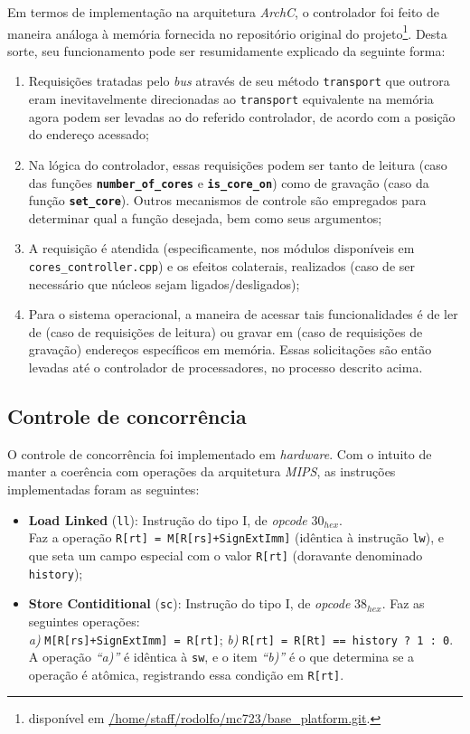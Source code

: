 \documentclass[11pt, a4paper]{article}
\begin{document}
Em termos de implementação na arquitetura \textit{ArchC}, o controlador foi feito de maneira análoga à memória fornecida no repositório original do projeto\footnote{disponível em \url{/home/staff/rodolfo/mc723/base_platform.git}.}. Desta sorte, seu funcionamento pode ser resumidamente explicado da seguinte forma:
\begin{enumerate}
\item Requisições tratadas pelo \textit{bus} através de seu método \texttt{transport} que outrora eram inevitavelmente direcionadas ao \texttt{transport} equivalente na memória agora podem ser levadas ao do referido controlador, de acordo com a posição do endereço acessado;
\item Na lógica do controlador, essas requisições podem ser tanto de leitura (caso das funções \textbf{\texttt{number\_of\_cores}} e \textbf{\texttt{is\_core\_on}}) como de gravação (caso da função \textbf{\texttt{set\_core}}). Outros mecanismos de controle são empregados para determinar qual a função desejada, bem como seus argumentos;
\item A requisição é atendida (especificamente, nos módulos disponíveis em \texttt{cores\_controller.cpp}) e os efeitos colaterais, realizados (caso de ser necessário que núcleos sejam ligados/desligados);
\item Para o sistema operacional, a maneira de acessar tais funcionalidades é de ler de (caso de requisições de leitura) ou gravar em (caso de requisições de gravação) endereços específicos em memória. Essas solicitações são então levadas até o controlador de processadores, no processo descrito acima.
\end{enumerate}

\subsection{Controle de concorrência}

O controle de concorrência foi implementado em \textit{hardware}. Com o intuito de manter a coerência com operações da arquitetura \textit{MIPS}, as instruções implementadas foram as seguintes:
\begin{itemize}
\item \textbf{Load Linked} (\texttt{ll}): Instrução do tipo I, de \textit{opcode} $30_{hex}$. \\ Faz a operação \texttt{R[rt] = M[R[rs]+SignExtImm]} (idêntica à instrução \texttt{lw}), e que seta um campo especial com o valor \texttt{R[rt]} (doravante denominado \texttt{history});
\item \textbf{Store Contiditional} (\texttt{sc}): Instrução do tipo I, de \textit{opcode} $38_{hex}$. Faz as seguintes operações: \\ \textit{a)} \texttt{M[R[rs]+SignExtImm] = R[rt]}; \textit{b)} \texttt{R[rt] = R[Rt] == history ? 1 : 0}. \\ A operação \textit{``a)''} é idêntica à \texttt{sw}, e o item \textit{``b)''} é o que determina se a operação é atômica, registrando essa condição em \texttt{R[rt]}.
\end{itemize}
\end{document}
